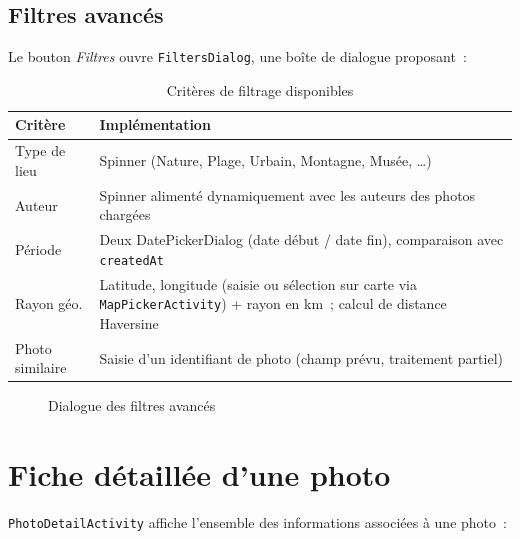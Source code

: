 \documentclass[12pt, a4paper, openany]{report}
\begin{document}
\subsection{Filtres avancés}

Le bouton \emph{Filtres} ouvre \texttt{FiltersDialog}, une boîte de dialogue proposant~:

\begin{table}[H]
\centering
\caption{Critères de filtrage disponibles}
\begin{tabularx}{\textwidth}{lX}
\toprule
\rowcolor{primary!15}
\textbf{Critère} & \textbf{Implémentation} \\
\midrule
Type de lieu    & Spinner (Nature, Plage, Urbain, Montagne, Musée, \ldots) \\
Auteur          & Spinner alimenté dynamiquement avec les auteurs des photos chargées \\
Période         & Deux DatePickerDialog (date début / date fin), comparaison avec \texttt{createdAt} \\
Rayon géo.      & Latitude, longitude (saisie ou sélection sur carte via \texttt{MapPickerActivity}) + rayon en km~; calcul de distance Haversine \\
Photo similaire & Saisie d'un identifiant de photo (champ prévu, traitement partiel) \\
\bottomrule
\end{tabularx}
\end{table}

\begin{figure}[H]
  \centering
  \caption{Dialogue des filtres avancés}
  \label{fig:filters}
\end{figure}

\section{Fiche détaillée d'une photo}

\texttt{PhotoDetailActivity} affiche l'ensemble des informations associées à une photo~:
\end{document}

